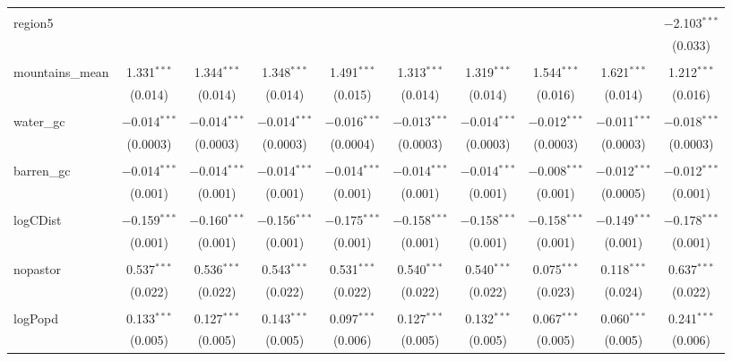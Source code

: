 \begin{table}[!htbp]
\begin{tabular}{@{\extracolsep{5pt}}lccccccccc}
  & & & & & & & & & \\ 
 region5 &  &  &  &  &  &  &  &  & $-$2.103$^{***}$ \\ 
  &  &  &  &  &  &  &  &  & (0.033) \\ 
  & & & & & & & & & \\ 
 mountains\_mean & 1.331$^{***}$ & 1.344$^{***}$ & 1.348$^{***}$ & 1.491$^{***}$ & 1.313$^{***}$ & 1.319$^{***}$ & 1.544$^{***}$ & 1.621$^{***}$ & 1.212$^{***}$ \\ 
  & (0.014) & (0.014) & (0.014) & (0.015) & (0.014) & (0.014) & (0.016) & (0.014) & (0.016) \\ 
  & & & & & & & & & \\ 
 water\_gc & $-$0.014$^{***}$ & $-$0.014$^{***}$ & $-$0.014$^{***}$ & $-$0.016$^{***}$ & $-$0.013$^{***}$ & $-$0.014$^{***}$ & $-$0.012$^{***}$ & $-$0.011$^{***}$ & $-$0.018$^{***}$ \\ 
  & (0.0003) & (0.0003) & (0.0003) & (0.0004) & (0.0003) & (0.0003) & (0.0003) & (0.0003) & (0.0003) \\ 
  & & & & & & & & & \\ 
 barren\_gc & $-$0.014$^{***}$ & $-$0.014$^{***}$ & $-$0.014$^{***}$ & $-$0.014$^{***}$ & $-$0.014$^{***}$ & $-$0.014$^{***}$ & $-$0.008$^{***}$ & $-$0.012$^{***}$ & $-$0.012$^{***}$ \\ 
  & (0.001) & (0.001) & (0.001) & (0.001) & (0.001) & (0.001) & (0.001) & (0.0005) & (0.001) \\ 
  & & & & & & & & & \\ 
 logCDist & $-$0.159$^{***}$ & $-$0.160$^{***}$ & $-$0.156$^{***}$ & $-$0.175$^{***}$ & $-$0.158$^{***}$ & $-$0.158$^{***}$ & $-$0.158$^{***}$ & $-$0.149$^{***}$ & $-$0.178$^{***}$ \\ 
  & (0.001) & (0.001) & (0.001) & (0.001) & (0.001) & (0.001) & (0.001) & (0.001) & (0.001) \\ 
  & & & & & & & & & \\ 
 nopastor & 0.537$^{***}$ & 0.536$^{***}$ & 0.543$^{***}$ & 0.531$^{***}$ & 0.540$^{***}$ & 0.540$^{***}$ & 0.075$^{***}$ & 0.118$^{***}$ & 0.637$^{***}$ \\ 
  & (0.022) & (0.022) & (0.022) & (0.022) & (0.022) & (0.022) & (0.023) & (0.024) & (0.022) \\ 
  & & & & & & & & & \\ 
 logPopd & 0.133$^{***}$ & 0.127$^{***}$ & 0.143$^{***}$ & 0.097$^{***}$ & 0.127$^{***}$ & 0.132$^{***}$ & 0.067$^{***}$ & 0.060$^{***}$ & 0.241$^{***}$ \\ 
  & (0.005) & (0.005) & (0.005) & (0.006) & (0.005) & (0.005) & (0.005) & (0.005) & (0.006) \\ 

\end{tabular}
\end{table}
